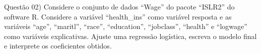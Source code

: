 
\noindent \textcolor{COLOR1}{Questão 02)} Considere o conjunto de dados ``Wage'' do pacote ``ISLR2'' do software R. Considere a variável ``health\_ins'' como variável resposta e as variáveis ``age'', ``maritl'', ``race'', ``education'', ``jobclass'', ``health'' e ``logwage'' como variáveis explicativas. Ajuste uma regressão logística, escreva o modelo final e interprete os coeficientes obtidos.
\\

